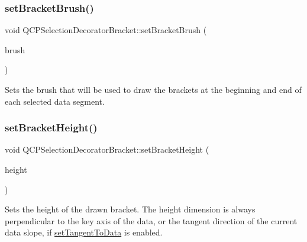 \mbox{\label{class_q_c_p_selection_decorator_bracket_a2f4ea0bfb0ea980252b76dd349dd53aa}} 
\subsubsection{\texorpdfstring{setBracketBrush()}{setBracketBrush()}}
{\footnotesize\ttfamily void Q\+C\+P\+Selection\+Decorator\+Bracket\+::set\+Bracket\+Brush (\begin{DoxyParamCaption}\item[{const Q\+Brush \&}]{brush }\end{DoxyParamCaption})}

Sets the brush that will be used to draw the brackets at the beginning and end of each selected data segment. \mbox{\label{class_q_c_p_selection_decorator_bracket_aed773ad737201cca40efc6fe451acad8}} 
\subsubsection{\texorpdfstring{setBracketHeight()}{setBracketHeight()}}
{\footnotesize\ttfamily void Q\+C\+P\+Selection\+Decorator\+Bracket\+::set\+Bracket\+Height (\begin{DoxyParamCaption}\item[{int}]{height }\end{DoxyParamCaption})}

Sets the height of the drawn bracket. The height dimension is always perpendicular to the key axis of the data, or the tangent direction of the current data slope, if \mbox{\hyperlink{class_q_c_p_selection_decorator_bracket_a93bc6086e53a5e40a08641a7b2e2cdd5}{set\+Tangent\+To\+Data}} is enabled. \mbox{\label{class_q_c_p_selection_decorator_bracket_ac0e392a6097990f8aa978932a8fa05d6}} 
